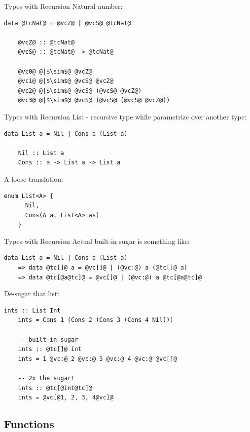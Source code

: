 \documentclass[xcolor={usenames,dvipsnames}]{beamer}
\begin{document}
\begin{frame}[fragile]{Types with Recursion}
  Natural number:
  \begin{lstlisting}[style=hask]
    data @tcNat@ = @vcZ@ | @vcS@ @tcNat@

    @vcZ@ :: @tcNat@
    @vcS@ :: @tcNat@ -> @tcNat@

    @vc0@ @|$\sim$@ @vcZ@
    @vc1@ @|$\sim$@ @vcS@ @vcZ@
    @vc2@ @|$\sim$@ @vcS@ (@vcS@ @vcZ@)
    @vc3@ @|$\sim$@ @vcS@ (@vcS@ (@vcS@ @vcZ@))
  \end{lstlisting}
\end{frame}

\begin{frame}[fragile]{Types with Recursion}
  List - recursive type while parametrize over another type:
  \begin{lstlisting}[style=hask]
    data List a = Nil | Cons a (List a)

    Nil :: List a
    Cons :: a -> List a -> List a
  \end{lstlisting}

  \pause
  A loose translation:
  \begin{lstlisting}[style=hask]
    enum List<A> {
      Nil,
      Cons(A a, List<A> as)
    }
  \end{lstlisting}
\end{frame}

\begin{frame}[fragile]{Types with Recursion}
  Actual built-in sugar is something like:
  \begin{lstlisting}[style=hask]
       data List a = Nil | Cons a (List a)
    => data @tc[]@ a = @vc[]@ | (@vc:@) a (@tc[]@ a)
    => data @tc[@a@tc]@ = @vc[]@ | (@vc:@) a @tc[@a@tc]@
  \end{lstlisting}

  \pause
  De-sugar that list:
  \begin{lstlisting}[style=hask]
    ints :: List Int 
    ints = Cons 1 (Cons 2 (Cons 3 (Cons 4 Nil)))

    -- built-in sugar
    ints :: @tc[]@ Int
    ints = 1 @vc:@ 2 @vc:@ 3 @vc:@ 4 @vc:@ @vc[]@

    -- 2x the sugar!
    ints :: @tc[@Int@tc]@
    ints = @vc[@1, 2, 3, 4@vc]@
  \end{lstlisting}
\end{frame}


\subsection{Functions}
\end{document}
